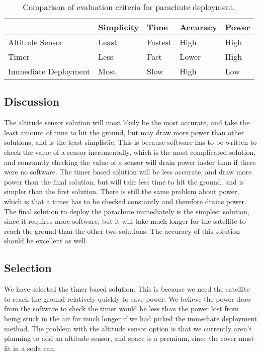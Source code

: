 \documentclass[10pt,serif,draftclsnofoot,onecolumn]{IEEEtran}
\begin{document}
\begin{table}[h!]
  \centering
  \caption{Comparison of evaluation criteria for parachute deployment.}
  \label{tab:table1}
  \begin{tabular}{l||l|l|l|l}
                         & Simplicity & Time    & Accuracy & Power\\
    \hline
    Altitude Sensor      & Least      & Fastest & High     & High\\
    \hline
    Timer                & Less       & Fast    & Lower    & High\\
    \hline
    Immediate Deployment & Most       & Slow    & High     & Low\\
  \end{tabular}
\end{table}

\subsection{Discussion}
The altitude sensor solution will most likely be the most accurate, and take the least amount of time to hit the ground, but may draw more power than other solutions, and is the least simplistic. This is because software has to be written to check the value of a sensor incrementally, which is the most complicated solution, and constantly checking the value of a sensor will drain power faster than if there were no software. The timer based solution will be less accurate, and draw more power than the final solution, but will take less time to hit the ground, and is simpler than the first solution. There is still the same problem about power, which is that a timer has to be checked constantly and therefore drains power. The final solution to deploy the parachute immediately is the simplest solution, since it requires more software, but it will take much longer for the satellite to reach the ground than the other two solutions. The accuracy of this solution should be excellent as well.

\subsection{Selection}
We have selected the timer based solution. This is because we need the satellite to reach the ground relatively quickly to save power. We believe the power draw from the software to check the timer would be less than the power lost from being stuck in the air for much longer if we had picked the immediate deployment method. The problem with the altitude sensor option is that we currently aren’t planning to add an altitude sensor, and space is a premium, since the rover must fit in a soda can.
	
\end{document}

